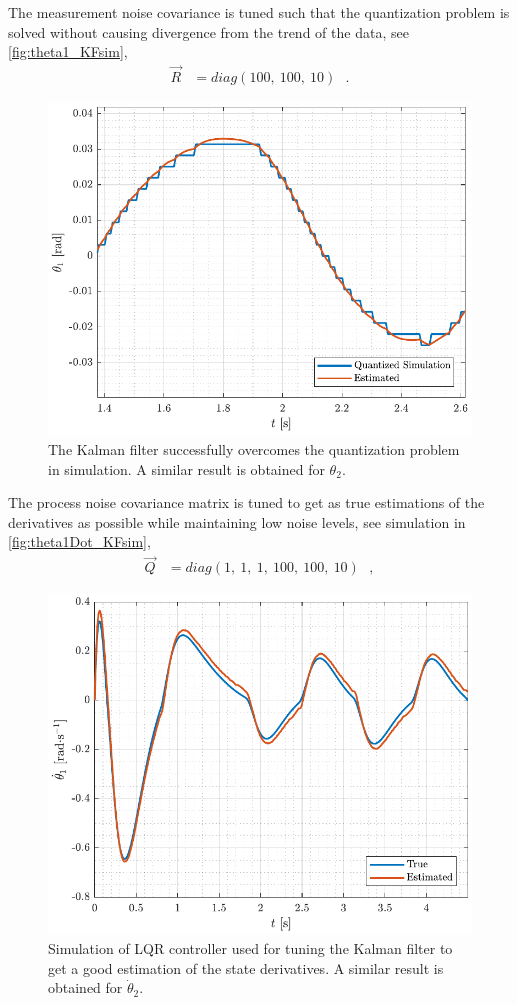 The measurement noise covariance is tuned such that the quantization problem is solved without causing divergence from the trend of the data, see \autoref{fig:theta1_KFsim},
\begin{align}
\vec{R} &= diag( 100,\ 100,\ 10 )  \ \ \ .
\end{align}
%
\begin{figure}[H]
  \includegraphics[width=.7\textwidth]{figures/theta1_KFsim}
  \caption{The Kalman filter successfully overcomes the quantization problem in simulation. A similar result is obtained for $\theta_2$.}
  \label{fig:theta1_KFsim}
\end{figure}
%
The process noise covariance matrix is tuned to get as true estimations of the derivatives as possible while maintaining low noise levels, see simulation in \autoref{fig:theta1Dot_KFsim},
\begin{align}
\vec{Q} &= diag( 1,\ 1,\ 1,\ 100,\ 100,\ 10 )  \ \ \ ,
\end{align}
%
\begin{figure}[H]
  \includegraphics[width=.7\textwidth]{figures/theta1Dot_KFsim}
  \caption{Simulation of LQR controller used for tuning the Kalman filter to get a good estimation of the state derivatives. A similar result is obtained for $\dot{\theta}_2$.}
  \label{fig:theta1Dot_KFsim}
\end{figure}
